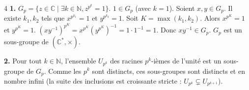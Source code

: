 \begin{correction}{4}
\textbf{1.} $G_p = \{ z \in \mathbb{C} \mid \exists k \in \mathbb{N}, z^{p^k}=1 \}$.
$1 \in G_p$ (avec $k=1$).
Soient $x, y \in G_p$. Il existe $k_1, k_2$ tels que $x^{p^{k_1}}=1$ et $y^{p^{k_2}}=1$.
Soit $K = \max(k_1, k_2)$. Alors $x^{p^K}=1$ et $y^{p^K}=1$.
$(xy^{-1})^{p^K} = x^{p^K} (y^{p^K})^{-1} = 1 \cdot 1^{-1} = 1$.
Donc $xy^{-1} \in G_p$. $G_p$ est un sous-groupe de $(\mathbb{C}^*, \times)$.

\textbf{2.} Pour tout $k \in \mathbb{N}$, l'ensemble $U_{p^k}$ des racines $p^k$-ièmes de l'unité est un sous-groupe de $G_p$.
Comme les $p^k$ sont distincts, ces sous-groupes sont distincts et en nombre infini (la suite des inclusions est croissante stricte : $U_{p^k} \subsetneq U_{p^{k+1}}$).
\end{correction}

